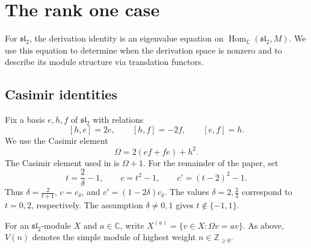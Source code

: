 \documentclass[11pt,reqno]{amsart}
\numberwithin{equation}{section}
\newcommand{\C}{\mathbb C}
\newcommand{\Z}{\mathbb Z}
\newcommand{\s}{\mathfrak{sl}_2}
\DeclareMathOperator{\Hom}{Hom}
\theoremstyle{definition}
\theoremstyle{remark}
\begin{document}
\section{The rank one case}\label{sec:rank-one}

For \(\s\), the derivation identity is an eigenvalue equation
on \(\Hom_\C(\s,M)\). We use this equation to determine when the
derivation space is nonzero and to describe its module structure via translation functors.

\subsection{Casimir identities}\label{sec:casimir}

Fix a basis \(e,h,f\) of \(\s\) with relations
\begin{equation}\label{eq:sl2}
[h,e]=2e,\qquad [h,f]=-2f,\qquad [e,f]=h.
\end{equation}
We use the Casimir element
\[
\Omega=2(ef+fe)+h^2.
\]
The Casimir element used in \cite{Maz10} is \(\Omega+1\).
For the remainder of the paper, set
\begin{equation}\label{eq:parameters}
t=\frac{2}{\delta}-1,\qquad c=t^2-1,\qquad c'=(t-2)^2-1.
\end{equation}
Thus \(\delta=\frac{2}{t+1}\), \(c=c_\delta\), and
\(c'=(1-2\delta)c_\delta\). The values
\(\delta=2,\frac{2}{3}\) correspond to \(t=0,2\), respectively.
The assumption \(\delta\ne0,1\) gives \(t\notin\{-1,1\}\).

For an \(\s\)-module \(X\) and \(a\in\C\), write
\(X^{(a)}=\{v\in X:\Omega v=av\}\).
As above, \(V(n)\) denotes the simple module of highest weight
\(n\in\Z_{\ge0}\).
\end{document}
